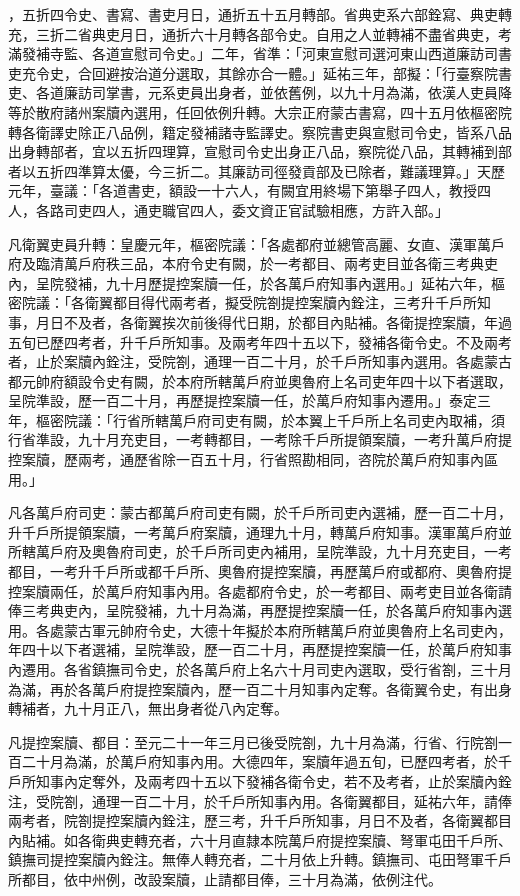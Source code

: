 \begin{pinyinscope}
，五折四令史、書寫、書吏月日，通折五十五月轉部。省典吏系六部銓寫、典吏轉充，三折二省典吏月日，通折六十月轉各部令史。自用之人並轉補不盡省典吏，考滿發補寺監、各道宣慰司令史。」二年，省準：「河東宣慰司選河東山西道廉訪司書吏充令史，合回避按治道分選取，其餘亦合一體。」延祐三年，部擬：「行臺察院書吏、各道廉訪司掌書，元系吏員出身者，並依舊例，以九十月為滿，依漢人吏員降等於散府諸州案牘內選用，任回依例升轉。大宗正府蒙古書寫，四十五月依樞密院轉各衛譯史除正八品例，籍定發補諸寺監譯史。察院書吏與宣慰司令史，皆系八品出身轉部者，宜以五折四理算，宣慰司令史出身正八品，察院從八品，其轉補到部者以五折四準算太優，今三折二。其廉訪司徑發貢部及已除者，難議理算。」天歷元年，臺議：「各道書吏，額設一十六人，有闕宜用終場下第舉子四人，教授四人，各路司吏四人，通吏職官四人，委文資正官試驗相應，方許入部。」



 凡衛翼吏員升轉：皇慶元年，樞密院議：「各處都府並總管高麗、女直、漢軍萬戶府及臨清萬戶府秩三品，本府令史有闕，於一考都目、兩考吏目並各衛三考典吏內，呈院發補，九十月歷提控案牘一任，於各萬戶府知事內選用。」延祐六年，樞密院議：「各衛翼都目得代兩考者，擬受院劄提控案牘內銓注，三考升千戶所知事，月日不及者，各衛翼挨次前後得代日期，於都目內貼補。各衛提控案牘，年過五旬已歷四考者，升千戶所知事。及兩考年四十五以下，發補各衛令史。不及兩考者，止於案牘內銓注，受院劄，通理一百二十月，於千戶所知事內選用。各處蒙古都元帥府額設令史有闕，於本府所轄萬戶府並奧魯府上名司吏年四十以下者選取，呈院準設，歷一百二十月，再歷提控案牘一任，於萬戶府知事內遷用。」泰定三年，樞密院議：「行省所轄萬戶府司吏有闕，於本翼上千戶所上名司吏內取補，須行省準設，九十月充吏目，一考轉都目，一考除千戶所提領案牘，一考升萬戶府提控案牘，歷兩考，通歷省除一百五十月，行省照勘相同，咨院於萬戶府知事內區用。」



 凡各萬戶府司吏：蒙古都萬戶府司吏有闕，於千戶所司吏內選補，歷一百二十月，升千戶所提領案牘，一考萬戶府案牘，通理九十月，轉萬戶府知事。漢軍萬戶府並所轄萬戶府及奧魯府司吏，於千戶所司吏內補用，呈院準設，九十月充吏目，一考都目，一考升千戶所或都千戶所、奧魯府提控案牘，再歷萬戶府或都府、奧魯府提控案牘兩任，於萬戶府知事內用。各處都府令史，於一考都目、兩考吏目並各衛請俸三考典吏內，呈院發補，九十月為滿，再歷提控案牘一任，於各萬戶府知事內選用。各處蒙古軍元帥府令史，大德十年擬於本府所轄萬戶府並奧魯府上名司吏內，年四十以下者選補，呈院準設，歷一百二十月，再歷提控案牘一任，於萬戶府知事內遷用。各省鎮撫司令史，於各萬戶府上名六十月司吏內選取，受行省劄，三十月為滿，再於各萬戶府提控案牘內，歷一百二十月知事內定奪。各衛翼令史，有出身轉補者，九十月正八，無出身者從八內定奪。



 凡提控案牘、都目：至元二十一年三月已後受院劄，九十月為滿，行省、行院劄一百二十月為滿，於萬戶府知事內用。大德四年，案牘年過五旬，已歷四考者，於千戶所知事內定奪外，及兩考四十五以下發補各衛令史，若不及考者，止於案牘內銓注，受院劄，通理一百二十月，於千戶所知事內用。各衛翼都目，延祐六年，請俸兩考者，院劄提控案牘內銓注，歷三考，升千戶所知事，月日不及者，各衛翼都目內貼補。如各衛典吏轉充者，六十月直隸本院萬戶府提控案牘、弩軍屯田千戶所、鎮撫司提控案牘內銓注。無俸人轉充者，二十月依上升轉。鎮撫司、屯田弩軍千戶所都目，依中州例，改設案牘，止請都目俸，三十月為滿，依例注代。



\end{pinyinscope}